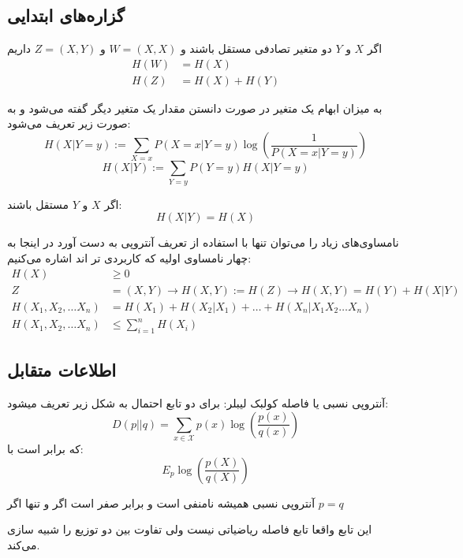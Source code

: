 \subsection{گزاره‌های ابتدایی}
\begin{theorem}
اگر
$X$
و
$Y$
دو متغیر تصادفی مستقل باشند و
$W = (X, X)$
و
$Z = (X, Y)$
داریم
\begin{align*}
    H(W) &= H(X) \\
    H(Z) &= H(X) + H(Y)
\end{align*}
\end{theorem}
\begin{definition}
	به میزان ابهام یک متغیر در صورت دانستن مقدار یک متغیر دیگر گفته می‌شود و به صورت زیر تعریف می‌شود:
$$H(X | Y = y) := \sum_{X = x} P(X = x| Y = y) \log(\frac{1}{P(X = x| Y = y)})$$
$$H(X|Y) := \sum_{Y = y} P(Y = y) H(X | Y = y)$$
\end{definition}

\begin{theorem}
اگر
$X$
و
$Y$
مستقل باشند:
$$H(X|Y) = H(X)$$
\end{theorem}
\begin{theorem}
	نامساوی‌های زیاد را می‌توان تنها با استفاده از تعریف آنتروپی به دست آورد در اینجا به چهار نامساوی اولیه که کاربردی تر اند اشاره می‌کنیم:
	\begin{align*}
H(X) &\geq 0 \\
Z &= (X, Y) \rightarrow H(X, Y) := H(Z) \rightarrow H(X, Y) = H(Y) + H(X|Y) \\
H(X_1, X_2, \dots X_n) &= H(X_1) + H(X_2 | X_1) + \dots + H(X_n | X_1 X_2 \dots X_n)\\
H(X_1, X_2, \dots X_n) &\leq \sum_{i = 1}^{n} H(X_i)
\end{align*}
\end{theorem}
\subsection{اطلاعات متقابل}
\begin{definition}
آنتروپی نسبی یا فاصله کولبک لیبلر: برای دو تابع احتمال به شکل زیر تعریف میشود:
$$
D(p||q) = \sum_{x \in \mathcal{X}} p(x) \log(\dfrac{p(x)}{q(x)})
$$
که برابر است با:
$$E_p \log(\dfrac{p(X)}{q(X)})$$
\end{definition}
\begin{theorem}
آنتروپی نسبی همیشه نامنفی است و برابر صفر است اگر و تنها اگر
$p = q$
\end{theorem}
این تابع واقعا تابع فاصله ریاضیاتی نیست ولی تفاوت بین دو توزیع را شبیه سازی می‌کند.

